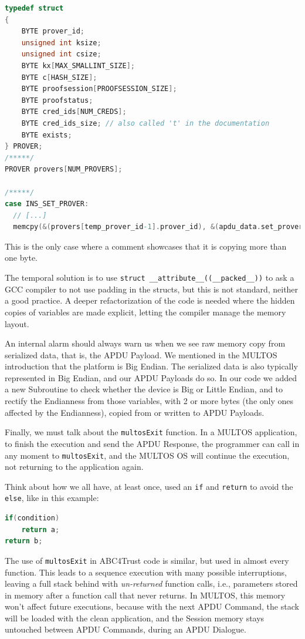 \begin{lstlisting}[language=C,frame=tblr]
typedef struct
{
	BYTE prover_id;
	unsigned int ksize;
	unsigned int csize;
	BYTE kx[MAX_SMALLINT_SIZE];
	BYTE c[HASH_SIZE];
	BYTE proofsession[PROOFSESSION_SIZE];
	BYTE proofstatus;
	BYTE cred_ids[NUM_CREDS];
	BYTE cred_ids_size; // also called 't' in the documentation
	BYTE exists;
} PROVER;
/*****/
PROVER provers[NUM_PROVERS];

/*****/
case INS_SET_PROVER:
  // [...]
  memcpy(&(provers[temp_prover_id-1].prover_id), &(apdu_data.set_prover_in.prover_id), 5); // under the hood, this also initializes ksize and csize
\end{lstlisting}
This is the only case where a comment showcases that it is copying more than one byte.

The temporal solution is to use \texttt{struct \_\_attribute\_\_((\_\_packed\_\_))} to ask a GCC compiler to not use padding in the structs, but this is not standard, neither a good practice. A deeper refactorization of the code is needed where the hidden copies of variables are made explicit, letting the compiler manage the memory layout.


\hfil

An internal alarm should always warn us when we see raw memory copy from serialized data, that is, the APDU Payload. We mentioned in the MULTOS introduction that the platform is Big Endian. The serialized data is also typically represented in Big Endian, and our APDU Payloads do so. In our code we added a new Subroutine to check whether the device is Big or Little Endian, and to rectify the Endianness from those variables, with 2 or more bytes (the only ones affected by the Endianness), copied from or written to APDU Payloads.


\hfil


Finally, we must talk about the \texttt{multosExit} function. In a MULTOS application, to finish the execution and send the APDU Response, the programmer can call in any moment to \texttt{multosExit}, and the MULTOS OS will continue the execution, not returning to the application again.

Think about how we all have, at least once, used an \texttt{if} and \texttt{return} to avoid the \texttt{else}, like in this example:

\begin{lstlisting}[language=C]
if(condition)
	return a;
return b;
\end{lstlisting}


The use of \texttt{multosExit} in ABC4Trust code is similar, but used in almost every function. This leads to a sequence execution with many possible interruptions, leaving a full stack behind with \textit{un-returned} function calls, i.e., parameters stored in memory after a function call that never returns. In MULTOS, this memory won't affect future executions, because with the next APDU Command, the stack will be loaded with the clean application, and the Session memory stays untouched between APDU Commands, during an APDU Dialogue. 

